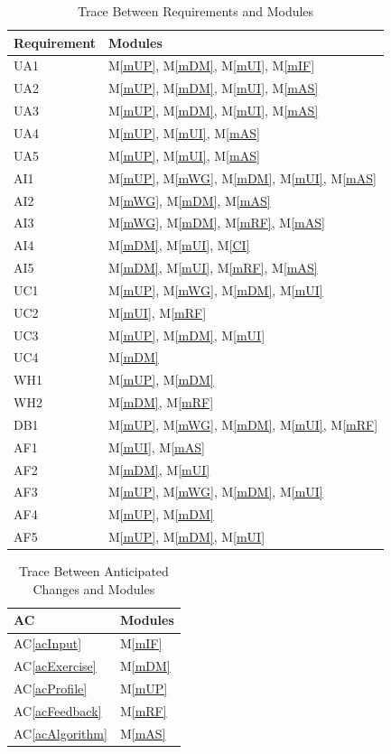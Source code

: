 \documentclass[12pt, titlepage]{article}
\newcommand{\acref}[1]{AC\ref{#1}}
\newcommand{\mref}[1]{M\ref{#1}}
\begin{document}
\begin{table}[H]
\centering
\begin{tabular}{p{} p{}}
\toprule
\textbf{Requirement} & \textbf{Modules}\\
\midrule
UA1 & \mref{mUP}, \mref{mDM}, \mref{mUI}, \mref{mIF}\\
UA2 & \mref{mUP}, \mref{mDM}, \mref{mUI}, \mref{mAS}\\
UA3 & \mref{mUP}, \mref{mDM}, \mref{mUI}, \mref{mAS}\\
UA4 & \mref{mUP}, \mref{mUI}, \mref{mAS}\\
UA5 & \mref{mUP}, \mref{mUI}, \mref{mAS}\\
AI1 & \mref{mUP}, \mref{mWG}, \mref{mDM}, \mref{mUI}, \mref{mAS}\\
AI2 & \mref{mWG}, \mref{mDM}, \mref{mAS}\\
AI3 & \mref{mWG}, \mref{mDM}, \mref{mRF}, \mref{mAS}\\
AI4 & \mref{mDM}, \mref{mUI}, \mref{CI}\\
AI5 & \mref{mDM}, \mref{mUI}, \mref{mRF}, \mref{mAS}\\
UC1 & \mref{mUP}, \mref{mWG}, \mref{mDM}, \mref{mUI}\\
UC2 & \mref{mUI}, \mref{mRF}\\
UC3 & \mref{mUP}, \mref{mDM}, \mref{mUI}\\
UC4 & \mref{mDM}\\
WH1 & \mref{mUP}, \mref{mDM}\\
WH2 & \mref{mDM}, \mref{mRF}\\
DB1 & \mref{mUP}, \mref{mWG}, \mref{mDM}, \mref{mUI}, \mref{mRF}\\
AF1 & \mref{mUI}, \mref{mAS}\\
AF2 & \mref{mDM}, \mref{mUI}\\
AF3 & \mref{mUP}, \mref{mWG}, \mref{mDM}, \mref{mUI} \\
AF4 & \mref{mUP}, \mref{mDM} \\
AF5 & \mref{mUP}, \mref{mDM}, \mref{mUI}\\
\bottomrule
\end{tabular}
\caption{Trace Between Requirements and Modules}
\label{TblRT}
\end{table}

\begin{table}[H]
\centering
\begin{tabular}{p{} p{}}
\toprule
\textbf{AC} & \textbf{Modules}\\
\midrule
\acref{acInput} & \mref{mIF}\\
\acref{acExercise} & \mref{mDM}\\
\acref{acProfile} & \mref{mUP}\\
\acref{acFeedback} & \mref{mRF}\\
\acref{acAlgorithm} & \mref{mAS}\\
\bottomrule
\end{tabular}
\caption{Trace Between Anticipated Changes and Modules}
\label{TblACT}
\end{table}
\end{document}
